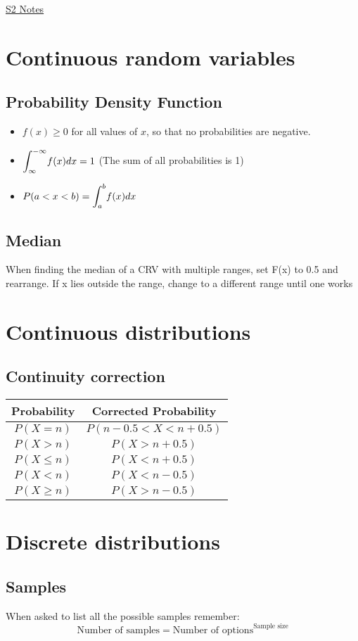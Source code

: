 \documentclass{article}[18pt]
\begin{document}
\begin{center}
\underline{\huge S2 Notes}
\end{center}
\section{Continuous random variables}
\subsection{Probability Density Function}
\begin{itemize}
\item $f(x)\geqslant 0$ for all values of $x$, so that no probabilities are negative.
\item $\mathlarger{\int_{\infty}^{-\infty}} f(x) dx=1$  (The sum of all probabilities is 1)
\item $P(a<x<b)=\mathlarger{\int_{a}^{b}} f(x) dx$
\end{itemize}
\subsection{Median}
When finding the median of a CRV with multiple ranges, set F(x) to 0.5 and rearrange. If x lies outside the range, change to a different range until one works
\section{Continuous distributions}
\subsection{Continuity correction}
{\renewcommand{\arraystretch}{1.5}
\begin{tabular}{|c|c|}
\hline
Probability&Corrected Probability\\
\hline
$P(X=n)$&$P(n-0.5<X<n+0.5)$\\
\hline
$P(X>n)$&$P(X>n+0.5)$\\
\hline
$P(X\leqslant n)$ &$P(X<n+0.5)$\\
\hline
$P(X<n)$&$P(X<n-0.5)$\\
\hline
$P(X\geqslant n)$&$P(X>n-0.5)$\\
\hline
\end{tabular}}
\section{Discrete distributions}
\subsection{Samples}
When asked to list all the possible samples remember:
$$\textrm{Number of samples}=\textrm{Number of options}^\textrm{Sample size}$$
\end{document}
